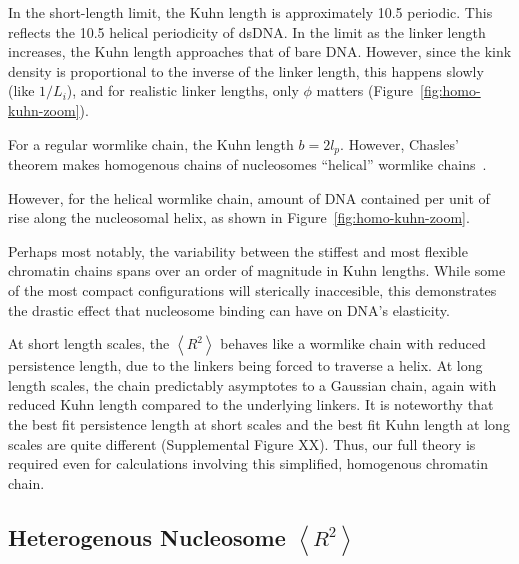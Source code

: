 \documentclass[%
 reprint,
superscriptaddress,
showpacs,preprintnumbers,
 amsmath,amssymb,
 aps,
 prl,
]{revtex4-1}
\newcommand{\RR}{\left\langle{}R^2\right\rangle{}}
\begin{document}
In the short-length limit, the Kuhn length is approximately \SI{10.5}{\basepair}
    periodic.
This reflects the \SI{10.5}{\basepair} helical periodicity of dsDNA.\@
In the limit as the linker length increases, the Kuhn length approaches that of
    bare DNA.\@
However, since the kink density is proportional to the inverse of the linker
    length, this happens slowly (like $1/L_i$), and for realistic linker
    lengths, only $\phi$ matters (Figure~\ref{fig:homo-kuhn-zoom}).

For a regular wormlike chain, the Kuhn length $b = 2 l_p$.
However, Chasles' theorem makes homogenous chains of nucleosomes ``helical''
    wormlike chains~\cite{yamakawa2016}.

However, for the helical wormlike chain,
    amount of DNA contained per unit of rise along the nucleosomal helix,
    as shown in Figure~\ref{fig:homo-kuhn-zoom}.

Perhaps most notably, the variability between the stiffest and most flexible
    chromatin chains spans over an order of magnitude in Kuhn lengths.
While some of the most compact configurations will sterically inaccesible, this
    demonstrates the drastic effect that nucleosome binding can have on DNA's
    elasticity.

At short length scales, the $\RR$ behaves like a wormlike chain with reduced
    persistence length, due to the linkers being forced to traverse a helix.
At long length scales, the chain predictably asymptotes to a Gaussian
    chain, again with reduced Kuhn length compared to the underlying linkers.
It is noteworthy that the best fit persistence length at short scales and the
    best fit Kuhn length at long scales are quite different (Supplemental Figure
    XX).
Thus, our full theory is required even for calculations involving this
    simplified, homogenous chromatin chain.


\subsection{\label{sec:hetero-kuhn}Heterogenous Nucleosome
\texorpdfstring{$\RR$}{<R2>}}
\end{document}
